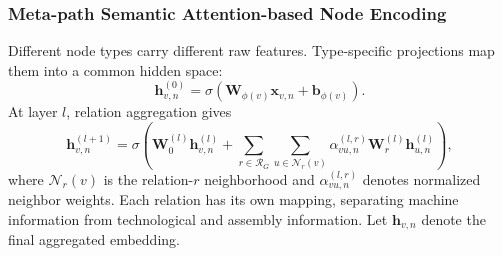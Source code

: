 \subsubsection{Meta-path Semantic Attention-based Node Encoding}

Different node types carry different raw features. Type-specific projections map them into a common hidden space:
\begin{equation}
 \boldsymbol{h}^{(0)}_{v,n}
 =\sigma(\boldsymbol{W}_{\phi(v)}\boldsymbol{x}_{v,n}+\boldsymbol{b}_{\phi(v)}).
 \label{eq:type_projection}
\end{equation}
At layer $l$, relation aggregation gives
\begin{equation}
 \boldsymbol{h}^{(l+1)}_{v,n}=\sigma\!\left(
 \boldsymbol{W}_0^{(l)}\boldsymbol{h}^{(l)}_{v,n}
 +\sum_{r\in\mathcal R_G}\sum_{u\in\mathcal N_r(v)}
 \alpha^{(l,r)}_{vu,n}\boldsymbol{W}_r^{(l)}\boldsymbol{h}^{(l)}_{u,n}\right),
 \label{eq:relation_aggregation}
\end{equation}
where $\mathcal N_r(v)$ is the relation-$r$ neighborhood and $\alpha^{(l,r)}_{vu,n}$ denotes normalized neighbor weights.
Each relation has its own mapping, separating machine information from technological and assembly information.
Let $\boldsymbol{h}_{v,n}$ denote the final aggregated embedding.


